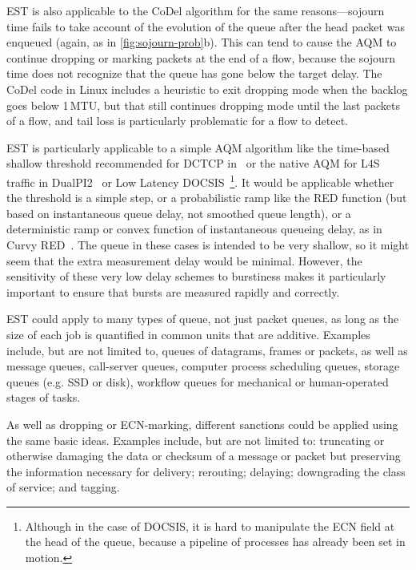 EST is also applicable to the CoDel algorithm for the same reasons---sojourn time fails to take account of the evolution of the queue after the head packet was enqueued (again, as in \autoref{fig:sojourn-prob}b). This can tend to cause the AQM to continue dropping or marking packets at the end of a flow, because the sojourn time does not recognize that the queue has gone below the target delay. The CoDel code in Linux includes a heuristic to exit dropping mode when the backlog goes below 1\,MTU, but that still continues dropping mode until the last packets of a flow, and tail loss is particularly problematic for a flow to detect.

EST is particularly applicable to a simple AQM algorithm like the time-based shallow threshold recommended for DCTCP in~\cite{Bai16:MQ-ECN} or the native AQM for L4S traffic in DualPI2~\cite[Appx.\ A]{Briscoe15e:DualQ-Coupled-AQM_ID} or Low Latency DOCSIS~\cite{CableLabs:DOCSIS3.1}\footnote{Although in the case of DOCSIS, it is hard to manipulate the ECN field at the head of the queue, because a pipeline of processes has already been set in motion.}. It would be applicable whether the threshold is a simple step, or a probabilistic ramp like the RED function (but based on instantaneous queue delay, not smoothed queue length), or a deterministic ramp or convex function of instantaneous queueing delay, as in Curvy RED~\cite[Appx.\ B]{Briscoe15e:DualQ-Coupled-AQM_ID}. The queue in these cases is intended to be very shallow, so it might seem that the extra measurement delay would be minimal. However, the sensitivity of these very low delay schemes to burstiness makes it particularly important to ensure that bursts are measured rapidly and correctly.

EST could apply to many types of queue, not just packet queues, as long as the size of each job is quantified in common units that are additive. Examples include, but are not limited to, queues of datagrams, frames or packets, as well as message queues, call-server queues, computer process scheduling queues, storage queues (e.g. SSD or disk), workflow queues for mechanical or human-operated stages of tasks. 

As well as dropping or ECN-marking, different sanctions could be applied using the same basic ideas. Examples include, but are not limited to: truncating or otherwise damaging the data or checksum of a message or packet but preserving the information necessary for delivery; rerouting; delaying; downgrading the class of service; and tagging.

